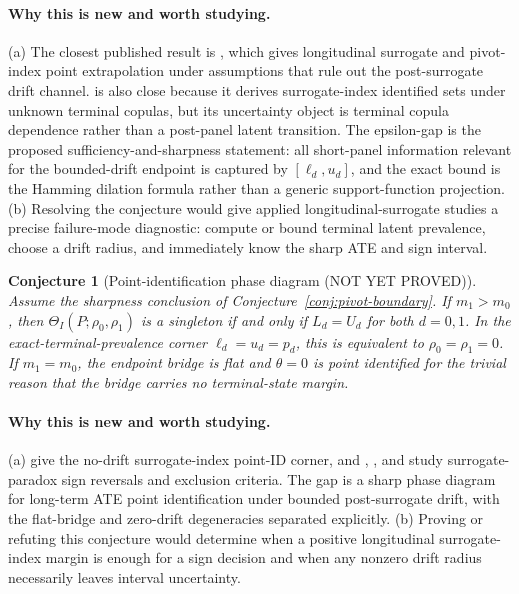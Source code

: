 \documentclass[11pt]{article}
\theoremstyle{definition}
\theoremstyle{plain}
\newtheorem{conjecture}{Conjecture}
\theoremstyle{remark}
\begin{document}
\paragraph{Why this is new and worth studying.}
(a) The closest published result is \citet{HuangWangYuanZhaoZhang2026}, which gives longitudinal surrogate and pivot-index point extrapolation under assumptions that rule out the post-surrogate drift channel.  \citet{FanManzanaresParkQi2026} is also close because it derives surrogate-index identified sets under unknown terminal copulas, but its uncertainty object is terminal copula dependence rather than a post-panel latent transition.  The epsilon-gap is the proposed sufficiency-and-sharpness statement: all short-panel information relevant for the bounded-drift endpoint is captured by \([\ell_d,u_d]\), and the exact bound is the Hamming dilation formula rather than a generic support-function projection.  (b) Resolving the conjecture would give applied longitudinal-surrogate studies a precise failure-mode diagnostic: compute or bound terminal latent prevalence, choose a drift radius, and immediately know the sharp ATE and sign interval.

\begin{conjecture}[Point-identification phase diagram (NOT YET PROVED)]\label{conj:phase-diagram}
Assume the sharpness conclusion of Conjecture~\ref{conj:pivot-boundary}.  If \(m_1>m_0\), then \(\Theta_I(P;\rho_0,\rho_1)\) is a singleton if and only if \(L_d=U_d\) for both \(d=0,1\).  In the exact-terminal-prevalence corner \(\ell_d=u_d=p_d\), this is equivalent to \(\rho_0=\rho_1=0\).  If \(m_1=m_0\), the endpoint bridge is flat and \(\theta=0\) is point identified for the trivial reason that the bridge carries no terminal-state margin.
\end{conjecture}

\paragraph{Why this is new and worth studying.}
(a) \citet{AtheyChettyImbensKang2019} give the no-drift surrogate-index point-ID corner, and \citet{ChenGengJia2007}, \citet{YinLiuGengLuo2020}, and \citet{MaYinLiuGeng2021} study surrogate-paradox sign reversals and exclusion criteria.  The gap is a sharp phase diagram for long-term ATE point identification under bounded post-surrogate drift, with the flat-bridge and zero-drift degeneracies separated explicitly.  (b) Proving or refuting this conjecture would determine when a positive longitudinal surrogate-index margin is enough for a sign decision and when any nonzero drift radius necessarily leaves interval uncertainty.
\end{document}
